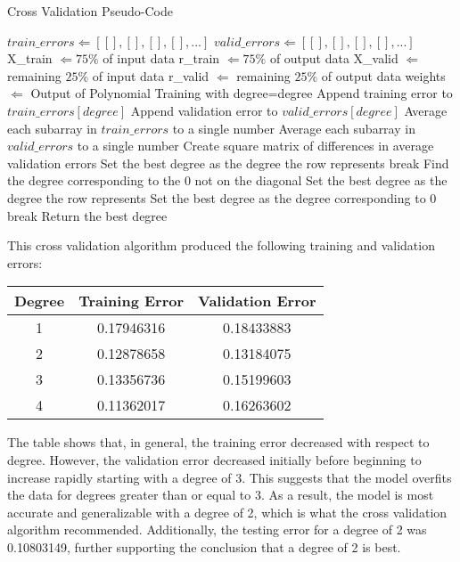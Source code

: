 \documentclass[12pt]{article}
\begin{document}
	\begin{algorithm} \label{cvalid}
		\caption{Cross Validation Pseudo-Code}
		\begin{algorithmic}
		    \State $train\_errors \Leftarrow [[], [], [], [], ...]$
		    \State $valid\_errors \Leftarrow [[], [], [], [], ...]$
		        \State X\_train $\Leftarrow 75\%$ of input data
		        \State r\_train $\Leftarrow 75\%$ of output data
		        \State X\_valid $\Leftarrow$ remaining $25\%$ of input data
		        \State r\_valid $\Leftarrow$
		        remaining $25\%$ of output data
		            \State weights $\Leftarrow$ Output of Polynomial Training with degree=degree
		            \State Append training error to $train\_errors[degree]$
		            \State Append validation error to $valid\_errors[degree]$
		        \EndFor
		    \EndFor
		    \State Average each subarray in $train\_errors$ to a single number
		    \State Average each subarray in $valid\_errors$ to a single number
		    \State Create square matrix of differences in average validation errors
		            \State Set the best degree as the degree the row represents
		            \State break
		            \State Find the degree corresponding to the 0 not on the diagonal
		                \State Set the best degree as the degree the row represents
		            \Else
		                \State Set the best degree as the degree corresponding to 0
		            \EndIf
		            \State break
		        \EndIf
		    \EndFor
		    \State Return the best degree
		\end{algorithmic} 
	\end{algorithm}
	
	This cross validation algorithm produced the following training and validation errors:
	\begin{center}
		\begin{tabular}{| c | c | c |}
			\hline
			Degree & Training Error & Validation Error \\ \hline
			1 & 0.17946316 & 0.18433883 \\ \hline
			2 & 0.12878658 & 0.13184075 \\ \hline
			3 & 0.13356736 & 0.15199603 \\ \hline
			4 & 0.11362017 & 0.16263602 \\
			\hline
		\end{tabular}
	\end{center}
    The table shows that, in general, the training error decreased with respect to degree. However, the validation error decreased initially before beginning to increase rapidly starting with a degree of 3. This suggests that the model overfits the data for degrees greater than or equal to 3. As a result, the model is most accurate and generalizable with a degree of 2, which is what the cross validation algorithm recommended. Additionally, the testing error for a degree of 2 was 0.10803149, further supporting the conclusion that a degree of 2 is best.
    
\end{document}
